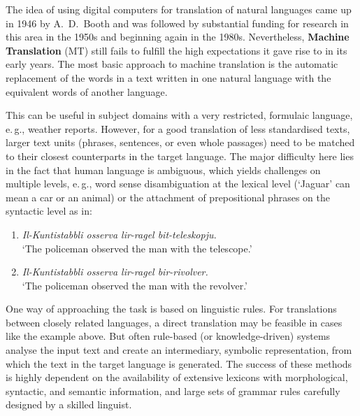 \begin{multicols}{2}
The idea of using digital computers for translation of natural languages came up in 1946 by A.~D.~Booth and was followed by substantial funding for research in this area in the 1950s and beginning again in the 1980s. Nevertheless, \textbf{Machine Translation} (MT) still fails to fulfill the high expectations it gave rise to in its early years.  
The most basic approach to machine translation is the automatic replacement of the words in a text written in one natural language with the equivalent words of another language. 


This can be useful in subject domains with a very restricted, formulaic language, e.\,g., weather reports. However, for a good translation of less standardised texts, larger text units (phrases, sentences, or even whole passages) need to be matched to their closest counterparts in the target language. The major difficulty here lies in the fact that human language is ambiguous, which yields challenges on multiple levels, e.\,g., word sense disambiguation at the lexical level (`Jaguar' can mean a car or an animal) or the attachment of prepositional phrases on the syntactic level as in:

\begin{enumerate} %
\item \emph{Il-Kuntistabbli osserva lir-ragel bit-teleskopju.}\\
`The policeman observed the man with the telescope.'
\item \emph{Il-Kuntistabbli osserva lir-ragel bir-rivolver.}\\
`The policeman observed the man with the revolver.'
\end{enumerate}

One way of approaching the task is based on linguistic rules. For translations between closely related languages, a direct translation may be feasible in cases like the example above. But often rule-based (or knowledge-driven) systems analyse the input text and create an intermediary, symbolic representation, from which the text in the target language is generated. The success of these methods is highly dependent on the availability of extensive lexicons with morphological, syntactic, and semantic information, and large sets of grammar rules carefully designed by a skilled linguist.


\end{multicols}
